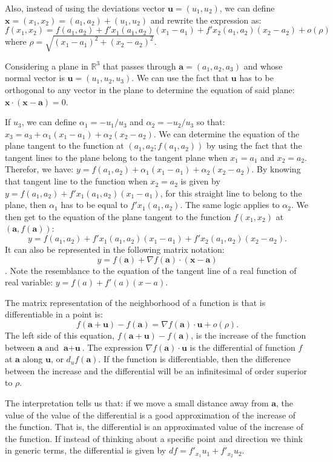 \documentclass[0pt, a4paper]{article}
\begin{document}
Also, instead of using the deviations vector $\textbf{u}=(u_1,u_2)$, we can define $\textbf{x}=(x_1,x_2)=(a_1,a_2)+(u_1,u_2)$ and rewrite the expression as:
$$f(x_1,x_2)=f(a_1,a_2)+f'{x_1}(a_1,a_2)(x_1-a_1)+f'{x_2}(a_1,a_2)(x_2-a_2)+o(\rho)$$
where $\rho=\sqrt{(x_1-a_1)^2+(x_2-a_2)^2}$.

Considering a plane in $\mathbb{R}^3$ that passes through $\textbf{a}=(a_1,a_2,a_3)$ and whose normal vector is $\textbf{u}=(u_1,u_2,u_3)$. We can use the fact that $\textbf{u}$ has to be orthogonal to any vector in the plane to determine the equation of said plane: $ \textbf{x}\cdot(\textbf{x}-\textbf{a}) =0$. 

If $u_3$, we can define $\alpha_1=-u_1/u_3$ and $\alpha_2=-u_2/u_3$ so that: $x_3=a_3+\alpha_1(x_1-a_1)+\alpha_2(x_2-a_2)$. We can determine the equation of the plane tangent to the function at $(a_1,a_2;f(a_1,a_2))$ by using the fact that the tangent lines to the plane belong to the tangent plane when $x_1=a_1$ and $x_2=a_2$. Therefor, we have: $y=f(a_1,a_2)+\alpha_1(x_1-a_1)+\alpha_2(x_2-a_2)$. By knowing that tangent line to the function when $x_2=a_2$ is given by $y=f(a_1,a_2)+f'{x_1}(a_1,a_2)(x_1-a_1)$, for this straight line to belong to the plane, then $\alpha_1$ has to be equal to $f'{x_1}(a_1,a_2)$. The same logic applies to $\alpha_2$. We then get to the equation of the plane tangent to the function $f(x_1, x_2)$ at $(\textbf{a}, f(\textbf{a}))$:
$$y=f(a_1,a_2)+f'{x_1}(a_1,a_2)(x_1-a_1)+f'{x_2}(a_1,a_2)(x_2-a_2).$$
It can also be represented in the following matrix notation:
$$ y = f(\textbf{a})+\nabla f(\textbf{a})\cdot(\textbf{x}-\textbf{a})$$.
Note the resemblance to the equation of the tangent line of a real function of real variable: $y=f(a)+f'(a)(x-a)$.

The matrix representation of the neighborhood of a function is that is differentiable in a point is:
$$f(\textbf{a}+\textbf{u})-f(\textbf{a})=\nabla f(\textbf{a})\cdot\textbf{u}+o(\rho).$$
The left side of this equation, $f(\textbf{a}+\textbf{u})-f(\textbf{a})$, is the increase of the function between $\textbf{a}$ and $\textbf{a}+\textbf{u}$. The expression $\nabla f(\textbf{a})\cdot\textbf{u}$ is the differential of function $f$ at $\textbf{a}$ along $\textbf{u}$, or $d_uf(\textbf{a})$. If the function is differentiable, then the difference between the increase and the differential will be an infinitesimal of order superior to $\rho$.

The interpretation tells us that: if we move a small distance away from $\textbf{a}$, the value of the value of the differential is a good approximation of the increase of the function. That is, the differential is an approximated value of the increase of the function. If instead of thinking about a specific point and direction we think in generic terms, the differential is given by $df=f'_{x_1}u_1+f'_{x_2}u_2$.
\end{document}
